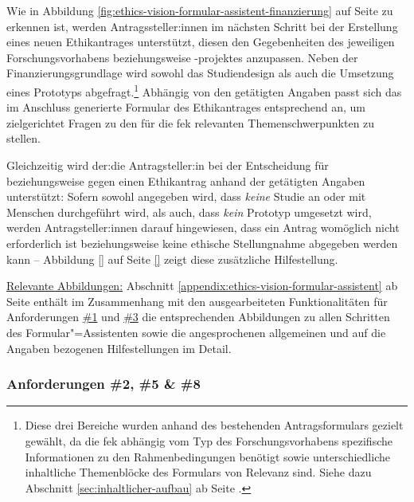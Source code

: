 \documentclass[a4paper,12pt,twoside]{scrreprt}
\begin{document}
Wie in Abbildung \ref{fig:ethics-vision-formular-assistent-finanzierung} auf Seite \pageref{fig:ethics-vision-formular-assistent-finanzierung} zu erkennen ist, werden Antragssteller:innen im nächsten Schritt bei der Erstellung eines neuen Ethikantrages unterstützt, diesen den Gegebenheiten des jeweiligen Forschungsvorhabens beziehungsweise -projektes anzupassen. Neben der Finanzierungsgrundlage wird sowohl das Studiendesign als auch die Umsetzung eines Prototyps abgefragt.\footnote{Diese drei Bereiche wurden anhand des bestehenden Antragsformulars gezielt gewählt, da die \ac{fek} abhängig vom Typ des Forschungsvorhabens spezifische Informationen zu den Rahmenbedingungen benötigt sowie unterschiedliche inhaltliche Themenblöcke des Formulars von Relevanz sind. Siehe dazu Abschnitt \ref{sec:inhaltlicher-aufbau} ab Seite \pageref{sec:inhaltlicher-aufbau}.} Abhängig von den getätigten Angaben passt sich das im Anschluss generierte Formular des Ethikantrages entsprechend an, um zielgerichtet Fragen zu den für die \ac{fek} relevanten Themenschwerpunkten zu stellen.

Gleichzeitig wird der:die Antragsteller:in bei der Entscheidung für beziehungsweise gegen einen Ethikantrag anhand der getätigten Angaben unterstützt: Sofern sowohl angegeben wird, dass \textit{keine} Studie an oder mit Menschen durchgeführt wird, als auch, dass \textit{kein} Prototyp umgesetzt wird, werden Antragsteller:innen darauf hingewiesen, dass ein Antrag womöglich nicht erforderlich ist beziehungsweise keine ethische Stellungnahme abgegeben werden kann -- Abbildung \ref{} auf Seite \ref{} zeigt diese zusätzliche Hilfestellung.

\medskip

\noindent\underline{Relevante Abbildungen:} Abschnitt \ref{appendix:ethics-vision-formular-assistent} ab Seite \pageref{appendix:ethics-vision-formular-assistent} enthält im Zusammenhang mit den ausgearbeiteten Funktionalitäten für Anforderungen \hyperref[sub-sub-sec:abgeleitete-anforderungen-vorfeld-antrag]{\#1} und \hyperref[sub-sub-sec:abgeleitete-anforderungen-während-erstellung-einreichung]{\#3} die entsprechenden Abbildungen zu allen Schritten des Formular"=Assistenten sowie die angesprochenen allgemeinen und auf die Angaben bezogenen Hilfestellungen im Detail.

\subsubsection*{Anforderungen \#2, \#5 \& \#8}
\label{sub-sub-sec:umgesetzte-funktionalitäten-anforderung-2-5-8}
\end{document}
